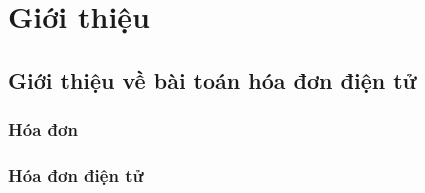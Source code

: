 \documentclass{article} %
\begin{document}

% 

% 

% 
% 
% 

% 

% 

% 

% 

% 

% 

% 

% 

% 

% 

\section{Giới thiệu}



\subsection{Giới thiệu về bài toán hóa đơn điện tử}



\subsubsection{Hóa đơn}



\subsubsection{Hóa đơn điện tử}



\end{document}
